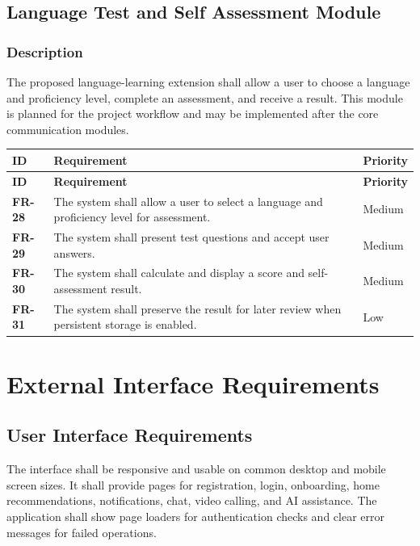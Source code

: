 \documentclass[12pt,a4paper]{report}
\newcommand{\req}[3]{\textbf{#1} & #2 & #3 \\ \hline}
\begin{document}
\section{Language Test and Self Assessment Module}
\subsection{Description}
The proposed language-learning extension shall allow a user to choose a language and proficiency level, complete an assessment, and receive a result. This module is planned for the project workflow and may be implemented after the core communication modules.

\begin{longtable}{|p{1.0in}|p{3.4in}|p{1.5in}|}
\hline
\rowcolor{gray!25}\textbf{ID} & \textbf{Requirement} & \textbf{Priority} \\ \hline
\endfirsthead
\hline
\rowcolor{gray!25}\textbf{ID} & \textbf{Requirement} & \textbf{Priority} \\ \hline
\endhead
\req{FR-28}{The system shall allow a user to select a language and proficiency level for assessment.}{Medium}
\req{FR-29}{The system shall present test questions and accept user answers.}{Medium}
\req{FR-30}{The system shall calculate and display a score and self-assessment result.}{Medium}
\req{FR-31}{The system shall preserve the result for later review when persistent storage is enabled.}{Low}
\end{longtable}

\chapter{External Interface Requirements}
\section{User Interface Requirements}
The interface shall be responsive and usable on common desktop and mobile screen sizes. It shall provide pages for registration, login, onboarding, home recommendations, notifications, chat, video calling, and AI assistance. The application shall show page loaders for authentication checks and clear error messages for failed operations.
\end{document}
